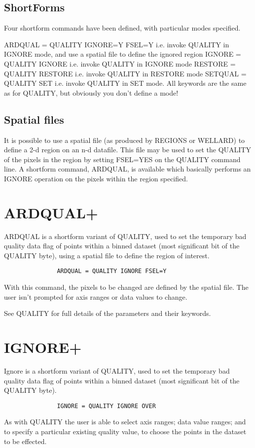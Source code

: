 \documentclass{book}
\renewcommand{\_}{{\tt\char'137}}     %
\begin{document}
\subsection{ShortForms}
Four shortform commands have been defined, with particular
modes specified.
 
ARDQUAL = QUALITY IGNORE=Y FSEL=Y
i.e. invoke QUALITY in IGNORE mode, and
use a spatial file to define the ignored region
IGNORE = QUALITY IGNORE
i.e. invoke QUALITY in IGNORE mode
RESTORE = QUALITY RESTORE
i.e. invoke QUALITY in RESTORE mode
SETQUAL = QUALITY SET
i.e. invoke QUALITY in SET mode.
All keywords are the same as for QUALITY, but obviously you don't
define a mode!
 
\subsection{Spatial files}
It is possible to use a spatial file (as produced by REGIONS or WELLARD)
to define a 2-d region on an n-d datafile. This file may be used to
set the QUALITY of the pixels in the region by setting FSEL=YES on
the QUALITY command line. A shortform command, ARDQUAL, is available
which basically performs an IGNORE operation on the pixels within
the region specified.
 
\section{ARDQUAL+}
ARDQUAL is a shortform variant of QUALITY, used to set the
temporary bad quality data flag of points within a binned
dataset (most significant bit of the QUALITY byte), using a
spatial file to define the region of interest.
 
\begin{verbatim}
               ARDQUAL = QUALITY IGNORE FSEL=Y
\end{verbatim}
With this command, the pixels to be changed are defined by the
spatial file. The user isn't prompted for axis ranges or data
values to change.
 
See QUALITY for full details of the parameters and their keywords.
 
\section{IGNORE+}
Ignore is a shortform variant of QUALITY, used to set the
temporary bad quality data flag of points within a binned
dataset (most significant bit of the QUALITY byte).
\begin{verbatim}
               IGNORE = QUALITY IGNORE OVER
\end{verbatim}
As with QUALITY the user is able to select axis ranges; data
value ranges; and to specify a particular existing quality value,
to choose the points in the dataset to be effected.
 
\end{document}
